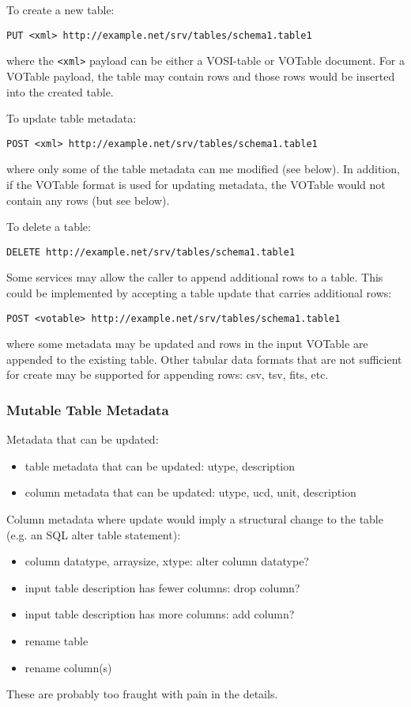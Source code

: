\documentclass[11pt,letter]{ivoa}
\begin{document}
To create a new table:
\begin{verbatim}
PUT <xml> http://example.net/srv/tables/schema1.table1
\end{verbatim}
\noindent where the \verb|<xml>| payload can be either a VOSI-table or VOTable document. For
a VOTable payload, the table may contain rows and those rows would be inserted into the created
table.

To update table metadata:
\begin{verbatim}
POST <xml> http://example.net/srv/tables/schema1.table1
\end{verbatim}
\noindent where only some of the table metadata can me modified (see below). In addition, if
the VOTable format is used for updating metadata, the VOTable would not contain any rows (but
see below).

To delete a table:
\begin{verbatim}
DELETE http://example.net/srv/tables/schema1.table1
\end{verbatim}

Some services may allow the caller to append additional rows to a table. This could be
implemented by accepting a table update that carries additional rows:
\begin{verbatim}
POST <votable> http://example.net/srv/tables/schema1.table1
\end{verbatim}
\noindent where some metadata may be updated and rows in the input VOTable are appended
to the existing table. Other tabular data formats that are not sufficient for create may be
supported for appending rows: csv, tsv, fits, etc. 

\subsubsection{Mutable Table Metadata}
Metadata that can be updated:
\begin{itemize}
\item table metadata that can be updated: utype, description
\item column metadata that can be updated: utype, ucd, unit, description
\end{itemize}

Column metadata where update would imply a structural change to the table (e.g. an SQL
alter table statement):
\begin{itemize}
\item column datatype, arraysize, xtype: alter column datatype?
\item input table description has fewer columns: drop column?
\item input table description has more columns: add column?
\item rename table
\item rename column(s)
\end{itemize}
\noindent These are probably too fraught with pain in the details. 
\end{document}

